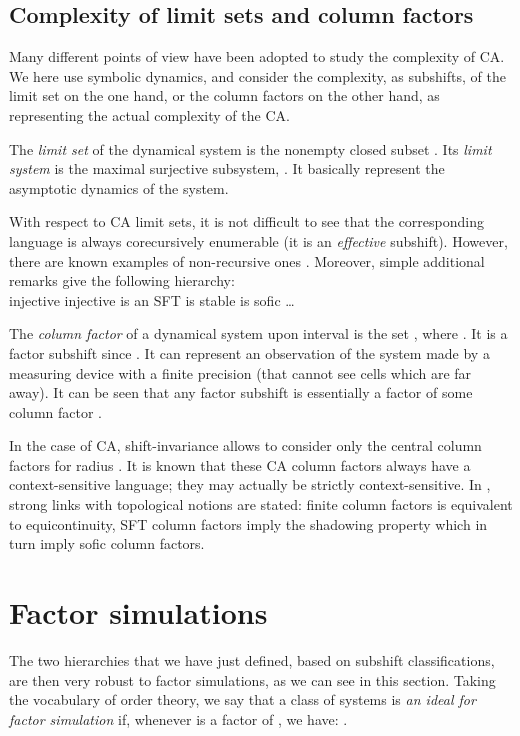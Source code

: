 \documentclass{jac}
\let\dfn\emph
\theoremstyle{definition}
\begin{document}
\subsection{Complexity of limit sets and column factors}

Many different points of view have been adopted to study the complexity of CA. We here use symbolic dynamics, and consider the complexity, as subshifts, of the limit set on the one hand, or the column factors on the other hand, as representing the actual complexity of the CA.

The \dfn{limit set} of the dynamical system is the nonempty closed subset . Its \dfn{limit system} is the maximal surjective subsystem, . It basically represent the asymptotic dynamics of the system.

With respect to CA limit sets, it is not difficult to see that the corresponding language is always corecursively enumerable (it is an \emph{effective} subshift). However, there are known examples of non-recursive ones \cite{langlim2}. Moreover, simple additional remarks \cite{revlim,kurka,nasu} give the following hierarchy:\\
 injective   injective   is an SFT   is stable   is sofic  \ldots\

The \dfn{column factor} of a dynamical system  upon interval  is the set , where . It is a factor subshift since . It can represent an observation of the system made by a measuring device with a finite precision (that cannot see cells which are far away). It can be seen that any factor subshift is essentially a factor of some column factor \cite{classif}.

In the case of CA, shift-invariance allows to consider only the central column factors  for radius .
It is known \cite{notes} that these CA column factors always have a context-sensitive language; they may actually be strictly context-sensitive. In \cite{classif}, strong links with topological notions are stated: finite column factors is equivalent to equicontinuity, SFT column factors imply the shadowing property which in turn imply sofic column factors.


\section{Factor simulations}\label{s:facsim}

The two hierarchies that we have just defined, based on subshift classifications, are then very robust to factor simulations, as we can see in this section.
Taking the vocabulary of order theory, we say that a class  of systems is \emph{an ideal for factor simulation} if, whenever  is a factor of , we have: .
\end{document}
